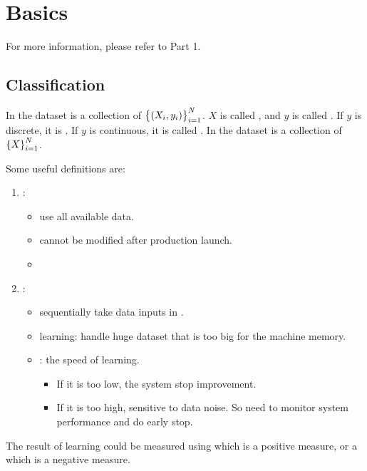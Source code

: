 \section{Basics}

For more information, please refer to \cite{AurelienGeron2019} Part 1.

\subsection{Classification}

In  the dataset is a collection of $\set{(X_i, y_i)}_{i=1}^N$. $X$ is called , and $y$ is called . If $y$ is discrete, it is . If $y$ is continuous, it is called . In  the dataset is a collection of $\set{X}_{i=1}^N$.

Some useful definitions are:
\begin{enumerate}
    \item {}: 
        \begin{itemize}
            \item use all available data.
            \item cannot be modified after production launch.
            \item {}
        \end{itemize}
    \item {}:
        \begin{itemize}
            \item sequentially take data inputs in .
            \item {} learning: handle huge dataset that is too big for the machine memory.
            \item {}: the speed of learning.
                \begin{itemize}
                    \item If it is too low, the system stop improvement.
                    \item If it is too high, sensitive to data noise. So need to monitor system performance and do early stop.
                \end{itemize}
        \end{itemize}
\end{enumerate}

The result of learning could be measured using  which is a positive measure, or a  which is a negative measure.




